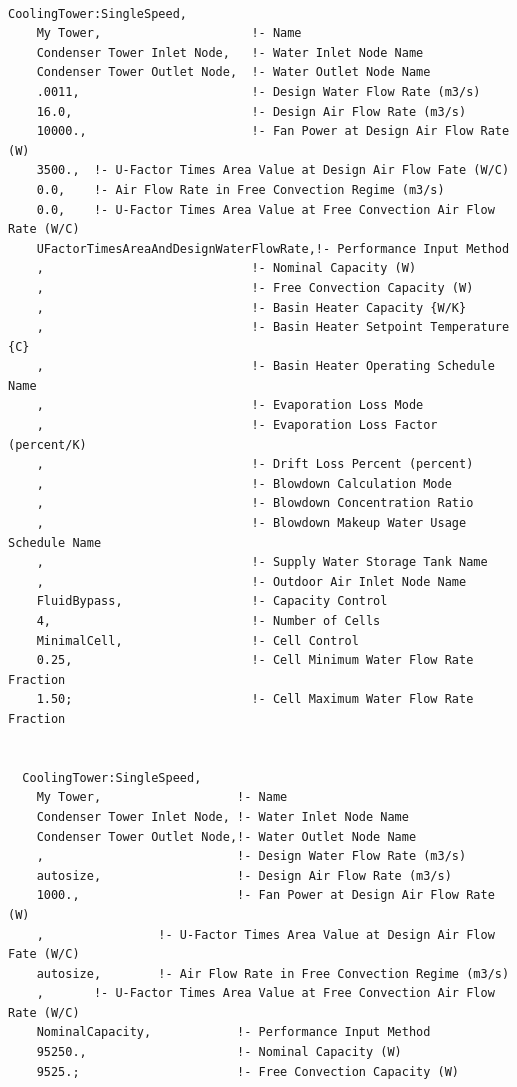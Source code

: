 \begin{lstlisting}

CoolingTower:SingleSpeed,
    My Tower,                     !- Name
    Condenser Tower Inlet Node,   !- Water Inlet Node Name
    Condenser Tower Outlet Node,  !- Water Outlet Node Name
    .0011,                        !- Design Water Flow Rate (m3/s)
    16.0,                         !- Design Air Flow Rate (m3/s)
    10000.,                       !- Fan Power at Design Air Flow Rate (W)
    3500.,  !- U-Factor Times Area Value at Design Air Flow Fate (W/C)
    0.0,    !- Air Flow Rate in Free Convection Regime (m3/s)
    0.0,    !- U-Factor Times Area Value at Free Convection Air Flow Rate (W/C)
    UFactorTimesAreaAndDesignWaterFlowRate,!- Performance Input Method
    ,                             !- Nominal Capacity (W)
    ,                             !- Free Convection Capacity (W)
    ,                             !- Basin Heater Capacity {W/K}
    ,                             !- Basin Heater Setpoint Temperature {C}
    ,                             !- Basin Heater Operating Schedule Name
    ,                             !- Evaporation Loss Mode
    ,                             !- Evaporation Loss Factor (percent/K)
    ,                             !- Drift Loss Percent (percent)
    ,                             !- Blowdown Calculation Mode
    ,                             !- Blowdown Concentration Ratio
    ,                             !- Blowdown Makeup Water Usage Schedule Name
    ,                             !- Supply Water Storage Tank Name
    ,                             !- Outdoor Air Inlet Node Name
    FluidBypass,                  !- Capacity Control
    4,                            !- Number of Cells
    MinimalCell,                  !- Cell Control
    0.25,                         !- Cell Minimum Water Flow Rate Fraction
    1.50;                         !- Cell Maximum Water Flow Rate Fraction


  CoolingTower:SingleSpeed,
    My Tower,                   !- Name
    Condenser Tower Inlet Node, !- Water Inlet Node Name
    Condenser Tower Outlet Node,!- Water Outlet Node Name
    ,                           !- Design Water Flow Rate (m3/s)
    autosize,                   !- Design Air Flow Rate (m3/s)
    1000.,                      !- Fan Power at Design Air Flow Rate (W)
    ,                !- U-Factor Times Area Value at Design Air Flow Fate (W/C)
    autosize,        !- Air Flow Rate in Free Convection Regime (m3/s)
    ,       !- U-Factor Times Area Value at Free Convection Air Flow Rate (W/C)
    NominalCapacity,            !- Performance Input Method
    95250.,                     !- Nominal Capacity (W)
    9525.;                      !- Free Convection Capacity (W)



\end{lstlisting}
